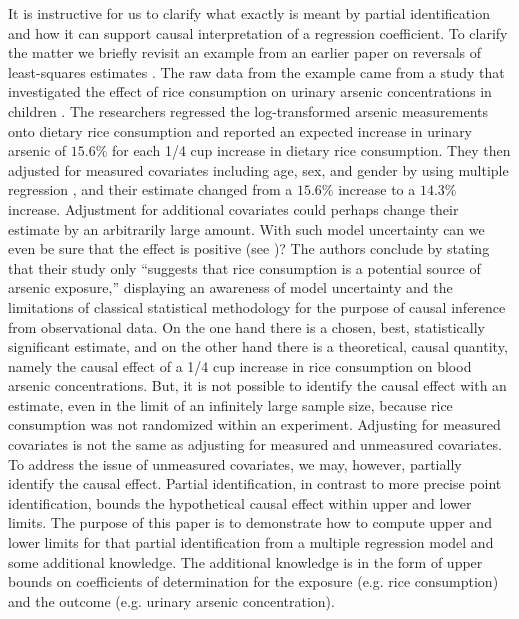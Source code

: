 \documentclass[11pt]{amsart}
\begin{document}
It is instructive for us to clarify what exactly is meant by partial identification and how it can support causal interpretation of a regression coefficient. To clarify the matter we briefly revisit an example from an earlier paper on reversals of least-squares estimates \citep{KD}. The raw data from the example came from a study that investigated the effect of rice consumption on urinary arsenic concentrations in children \citep{Davis2012}. The researchers regressed the log-transformed arsenic measurements onto dietary rice consumption and reported an expected increase in urinary arsenic of $15.6\%$ for each 1/4 cup increase in dietary rice consumption. They then adjusted for measured covariates including age, sex, and gender by using multiple regression \citep{McNamee2005}, and their estimate changed from a $15.6\%$ increase to a $14.3\%$ increase. Adjustment for additional covariates could perhaps change their estimate by an arbitrarily large amount. With such model uncertainty \citep{Chat} can we even be sure that the effect is positive (see \citep{KD})? The authors conclude by stating that their study only ``suggests that rice consumption is a potential source of arsenic exposure,'' displaying an awareness of model uncertainty and the limitations of classical statistical methodology for the purpose of causal inference from observational data. On the one hand there is a chosen, best, statistically significant estimate, and on the other hand there is a theoretical, causal quantity, namely the causal effect of a 1/4 cup increase in rice consumption on blood arsenic concentrations. But, it is not possible to identify the causal effect with an estimate, even in the limit of an infinitely large sample size, because rice consumption was not randomized within an experiment. Adjusting for measured covariates is not the same as adjusting for measured and unmeasured covariates. To address the issue of unmeasured covariates, we may, however, partially identify the causal effect. Partial identification, in contrast to more precise point identification, bounds the hypothetical causal effect within upper and lower limits. The purpose of this paper is to demonstrate how to compute upper and lower limits for that partial identification from a multiple regression model and some additional knowledge. The additional knowledge is in the form of upper bounds on coefficients of determination for the exposure (e.g. rice consumption) and the outcome (e.g. urinary arsenic concentration).
\end{document}
